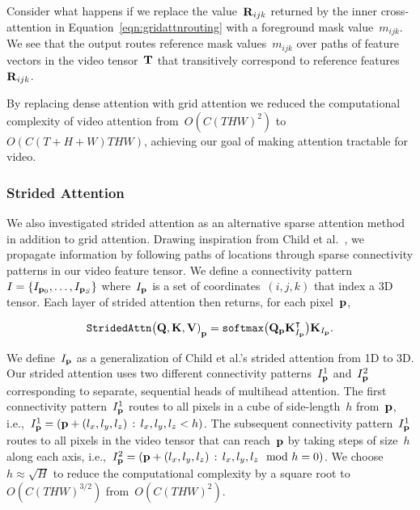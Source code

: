 Consider what happens if we replace the value~$\mathbf{R}{}_{ijk}$ returned by
the inner cross-attention in Equation~\ref{eqn:gridattnrouting} with a
foreground mask value~$m_{ijk}$.
We see that the output routes reference mask values~$m_{ijk}$ over paths of
feature vectors in the video tensor~$\mathbf{T}{}$ that transitively correspond
to reference features~$\mathbf{R}{}_{ijk}$.

By replacing dense attention with grid attention we reduced the computational
complexity of video attention from~$O(C{(THW)}^2)$ to~$O(C(T + H + W)THW)$,
achieving our goal of making attention tractable for video.

%


\subsubsection{Strided Attention}

We also investigated strided attention as an alternative sparse attention
method in addition to grid attention.
Drawing inspiration from Child et al.~\cite{child2019sparsetransformer}, we
propagate information by following paths of locations through sparse
connectivity patterns in our video feature tensor.
We define a connectivity
pattern~$I = \{I_{\mathbf{p}{}_0}, \dots, I_{\mathbf{p}{}_S}\}$
where~$I_{\mathbf{p}}{}$ is a set of coordinates~$(i, j, k)$ that index a 3D tensor.
Each layer of strided attention then returns, for each pixel~$\mathbf{p}{}$,

\begin{equation}
\mathtt{StridedAttn}{\big(\mathbf{Q}{}, \mathbf{K}{}, \mathbf{V}{})}_{\mathbf{p}}{} = \mathtt{softmax}{}\big(\mathbf{Q}{}_{\mathbf{p}}{} \mathbf{K}{}^\intercal_{I_{\mathbf{p}}{}}\big)\mathbf{K}{}_{I_{\mathbf{p}}{}}.
\label{eqn:stridedattndefn}
\end{equation}

We define~$I_{\mathbf{p}}{}$ as a generalization of Child et al.'s strided attention
from 1D to 3D\@.
Our strided attention uses two different connectivity patterns~$I^1_{\mathbf{p}}{}$
and~$I^2_{\mathbf{p}}{}$ corresponding to separate, sequential heads of multihead
attention.
The first connectivity pattern~$I^1_{\mathbf{p}}{}$ routes to all pixels in a cube of
side-length~$h$ from~$\mathbf{p}{}$,
i.e.,~$I^1_{\mathbf{p}}{} = (\mathbf{p}{} + (l_x, l_y, l_z) \,:\, l_x, l_y, l_z < h)$.
The subsequent connectivity pattern~$I^1_{\mathbf{p}}{}$ routes to all pixels in the
video tensor that can reach~$\mathbf{p}{}$ by taking steps of size~$h$ along each
axis,
i.e.,~$I^2_{\mathbf{p}}{} = (\mathbf{p}{} + (l_x, l_y, l_z) \,:\, l_x, l_y, l_z \mod h = 0)$.
We choose~$h\approx \sqrt{H}$ to reduce the computational complexity by a
square root to~$O(C{(THW)}^{3/2})$ from~$O(C{(THW)}^2)$.

